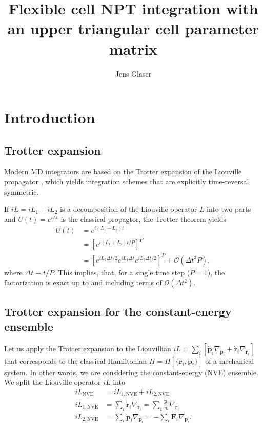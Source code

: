 \documentclass[12pt,letter]{article}
\title{Flexible cell NPT integration with an upper triangular cell parameter matrix}
\author{Jens Glaser}
\renewcommand{\vec}[1]{\mathbf{#1}}
\begin{document}
\maketitle


\section{Introduction}
\subsection{Trotter expansion}
Modern MD integrators are based on the Trotter expansion of the
Liouville propagator \cite{Tuckerman1992}, which yields
integration schemes that are explicitly time-reversal symmetric.

If $i L = i L_1 + iL_2$ is a decomposition of the Liouville operator $L$ into
two parts and $U(t) = e^{iL t}$ is the classical propagtor, the Trotter
theorem yields
\begin{align}
U(t)& = e^{i (L_1 + L_2) t}\\
&= \left[ e^{i (L_1+L_2) t/P} \right]^P\\
&=\left[ e^{i L_2 \Delta t/2} e^{i L_1 \Delta t} e^{i L_2 \Delta t/2} \right]^P
+\mathcal{O}(\Delta t^3 P),
\label{eq:trotter}
\end{align}
where $\Delta t\equiv t/P$.
This implies, that, for a single time step ($P=1$), the factorization
is exact up to and including terms of $\mathcal{O}(\Delta t^2)$.

\subsection{Trotter expansion for the constant-energy ensemble}
Let us apply the Trotter expansion to the Liouvillian $i L =
\sum_i\left[\dot{\vec{p}}_i \nabla_{\vec{p}_i} + \dot{\vec{r}}_i
  \nabla_{\vec r_i}\right]$ that corresponds to the classical
Hamiltonian $H=H[\{\vec r_i, \vec p_i\}]$ of a mechanical system.
In other words, we are considering the constant-energy (NVE) ensemble.
We split the Liouville operator $i L$ into 
\begin{align}
i L_{\mathrm{NVE}} &= i L_{1,\mathrm{NVE}} + i L_{2,\mathrm{NVE}}\label{eq:liouville_nve}\\
iL_{1,\mathrm{NVE}} & =\sum_i \dot{\vec{r}}_i \nabla_{\vec{r}_i}=\sum_i \frac{\vec p_i}{m} \nabla_{\vec{r}_i} \\
iL_{2,\mathrm{NVE}} &= \sum_i \dot{\vec{p}}_i \nabla_{\vec{p}_i}=- \sum_i \vec F_i \nabla_{\vec{p}_i}.
\end{align}
\end{document}
